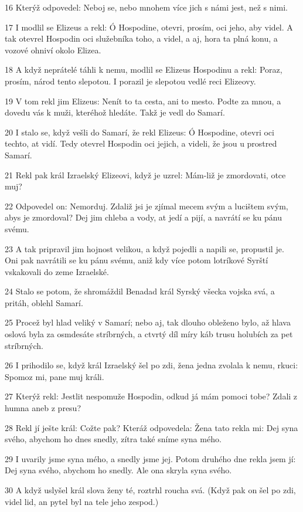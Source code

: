 \par 16 Kterýž odpovedel: Neboj se, nebo mnohem více jich s námi jest, než s nimi.
\par 17 I modlil se Elizeus a rekl: Ó Hospodine, otevri, prosím, oci jeho, aby videl. A tak otevrel Hospodin oci služebníka toho, a videl, a aj, hora ta plná konu, a vozové ohniví okolo Elizea.
\par 18 A když neprátelé táhli k nemu, modlil se Elizeus Hospodinu a rekl: Poraz, prosím, národ tento slepotou. I porazil je slepotou vedlé reci Elizeovy.
\par 19 V tom rekl jim Elizeus: Nenít to ta cesta, ani to mesto. Podte za mnou, a dovedu vás k muži, kteréhož hledáte. Takž je vedl do Samarí.
\par 20 I stalo se, když vešli do Samarí, že rekl Elizeus: Ó Hospodine, otevri oci techto, at vidí. Tedy otevrel Hospodin oci jejich, a videli, že jsou u prostred Samarí.
\par 21 Rekl pak král Izraelský Elizeovi, když je uzrel: Mám-liž je zmordovati, otce muj?
\par 22 Odpovedel on: Nemorduj. Zdaliž jsi je zjímal mecem svým a lucištem svým, abys je zmordoval? Dej jim chleba a vody, at jedí a pijí, a navrátí se ku pánu svému.
\par 23 A tak pripravil jim hojnost velikou, a když pojedli a napili se, propustil je. Oni pak navrátili se ku pánu svému, aniž kdy více potom lotríkové Syrští vskakovali do zeme Izraelské.
\par 24 Stalo se potom, že shromáždil Benadad král Syrský všecka vojska svá, a pritáh, oblehl Samarí.
\par 25 Procež byl hlad veliký v Samarí; nebo aj, tak dlouho obleženo bylo, až hlava oslová byla za osmdesáte stríbrných, a ctvrtý díl míry káb trusu holubích za pet stríbrných.
\par 26 I prihodilo se, když král Izraelský šel po zdi, žena jedna zvolala k nemu, rkuci: Spomoz mi, pane muj králi.
\par 27 Kterýž rekl: Jestlit nespomuže Hospodin, odkud já mám pomoci tobe? Zdali z humna aneb z presu?
\par 28 Rekl jí ješte král: Cožte pak? Kteráž odpovedela: Žena tato rekla mi: Dej syna svého, abychom ho dnes snedly, zítra také sníme syna mého.
\par 29 I uvarily jsme syna mého, a snedly jsme jej. Potom druhého dne rekla jsem jí: Dej syna svého, abychom ho snedly. Ale ona skryla syna svého.
\par 30 A když uslyšel král slova ženy té, roztrhl roucha svá. (Když pak on šel po zdi, videl lid, an pytel byl na tele jeho zespod.)
